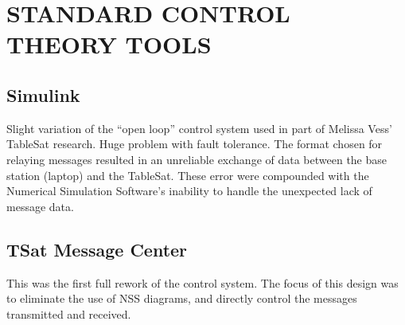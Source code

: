 
\chapter{STANDARD CONTROL THEORY TOOLS}
\label{chap:StandardTools}

\section{Simulink}
\label{sec:Simulink}

Slight variation of the ``open loop'' control system used in part of Melissa Vess' TableSat research.  Huge problem with fault tolerance.  The format chosen for relaying messages resulted in an unreliable exchange of data between the base station (laptop) and the TableSat.  These error were compounded with the Numerical Simulation Software's inability to handle the unexpected lack of message data.



\section{TSat Message Center}
\label{sec:TSatMessageCenter}

This was the first full rework of the control system.  The focus of this design was to eliminate the use of NSS diagrams, and directly control the messages transmitted and received.

